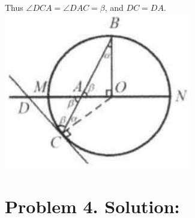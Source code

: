 \documentclass[10pt]{article}
\begin{document}
Thus \(\angle D C A=\angle D A C=\beta\), and \(D C=D A\).\\
\includegraphics[max width=\textwidth, center]{2025_04_17_97bc1f7e44d93c271a88g-157(1)}

\section*{Problem 4. Solution:}
\end{document}

